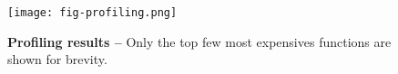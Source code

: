 
\begin{figure}[!hbt]

  \centering
  \texttt{[image: fig-profiling.png]}

  \caption{\textbf{Profiling results --} Only the top few most expensives functions are shown for brevity.}

  \label{fig-profiling}

\end{figure}
